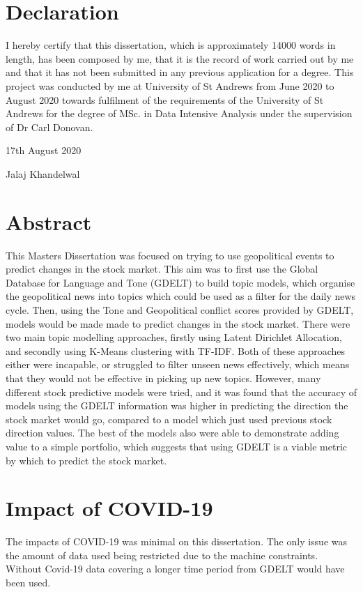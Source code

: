 \documentclass[a4paper]{article}
\begin{document}
\section*{Declaration}
I hereby certify that this dissertation, which is approximately 14000 words in length, has been composed by me, that it is the record of work carried out by me and that it has not been submitted in any previous application for a degree. This project was conducted by me at University of St Andrews from June 2020 to August 2020 towards fulfilment of the requirements of the University of St Andrews for the degree of MSc. in Data Intensive Analysis under the supervision of Dr Carl Donovan.

17th August 2020

Jalaj Khandelwal
\section*{Abstract}
This Masters Dissertation was focused on trying to use geopolitical events to predict changes in the stock market. This aim was to first use the Global Database for Language and Tone (GDELT) to build topic models, which organise the geopolitical news into topics which could be used as a filter for the daily news cycle. Then, using the Tone and Geopolitical conflict scores provided by GDELT, models would be made made to predict changes in the stock market. There were two main topic modelling approaches, firstly using Latent Dirichlet Allocation, and secondly using K-Means clustering with TF-IDF. Both of these approaches either were incapable, or struggled to filter unseen news effectively, which means that they would not be effective in picking up new topics. However, many different stock predictive models were tried, and it was found that the accuracy of models using the GDELT information was higher in predicting the direction the stock market would go, compared to a model which just used previous stock direction values. The best of the models also were able to demonstrate adding value to a simple portfolio, which suggests that using GDELT is a viable metric by which to predict the stock market. 
\section*{Impact of COVID-19}
The impacts of COVID-19 was minimal on this dissertation. The only issue was the amount of data used being restricted due to the machine constraints. Without Covid-19 data covering a longer time period from GDELT would have been used.
\newpage
\tableofcontents
\listoftables
\newpage
\listoffigures














\end{document}
